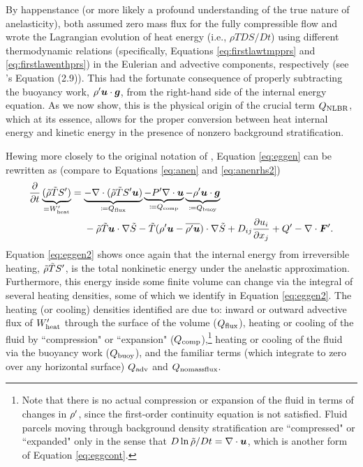 \documentclass[12pt]{article}
\newcommand{\vecf}{\bm{F}}
\newcommand{\heatnlbr}{Q_{\rm NLBR}}
\newcommand{\heatnomassflux}{Q_{\rm nomassflux}}
\newcommand{\heatadv}{Q_{\rm adv}}
\newcommand{\heatcomp}{Q_{\rm comp}}
\newcommand{\heatbuoy}{Q_{\rm buoy}}
\newcommand{\heatfluxin}{Q_{\rm flux}}
\newcommand{\wpheat}{W^\prime_{\rm heat}}
\begin{document}
By happenstance (or more likely a profound understanding of the true nature of anelasticity), \citet{Gough1969} both assumed zero mass flux for the fully compressible flow and wrote the Lagrangian evolution of heat energy (i.e., $\rho T DS/Dt$) using different thermodynamic relations (specifically, Equations \eqref{eq:firstlawtmpprs} and \eqref{eq:firstlawenthprs}) in the Eulerian and advective components, respectively (see \citet{Gough1969}'s Equation (2.9)). This had the fortunate consequence of properly subtracting the buoyancy work, ${\rho^\prime} \bm{u}\cdot \bm{g}$, from the right-hand side of the internal energy equation. As we now show, this is the physical origin of the crucial term $\heatnlbr$, which at its essence, allows for the proper conversion between heat internal energy and kinetic energy in the presence of nonzero background stratification. 

Hewing more closely to the original notation of \citet{Gough1969}, Equation \eqref{eq:eggen} can be rewritten as (compare to Equations \eqref{eq:anen} and \eqref{eq:anenrhs2})
\begin{align}\label{eq:eggen2}
\pderiv{}{t}\underbrace{(\rhotilde\tmptilde\entrprime)}_{=\wpheat} &=\underbrace{-\Div(\rhotilde\tmptilde \entrprime\vecu)}_{\define\heatfluxin} \underbrace{-\prsprime\Div\vecu}_{\define\heatcomp} \underbrace{-\rhoprime \vecu\cdot \vecg}_{\define\heatbuoy} \nonumber\\
&\ \ \ \ - \rhotilde\tmptilde \ugrad \entrtilde- \tmptilde(\rhoprime \vecu-\overline{\rhoprime\vecu})\cdot\nabla\entrtilde +D_{ij}\pderiv{u_i}{x_j} + Q^\prime- \Div\vecf^\prime.
\end{align}
Equation \eqref{eq:eggen2} shows once again that the internal energy from irreversible heating, $\tilde{\rho}\tilde{T} {S^\prime}$, is the total nonkinetic energy under the anelastic approximation. Furthermore, this energy inside some finite volume can change via the integral of several heating densities, some of which we identify in Equation \eqref{eq:eggen2}. The heating (or cooling) densities identified are due to: inward or outward advective flux of $\wpheat$ through the surface of the volume ($\heatfluxin$), heating or cooling of the fluid by ``compression" or ``expansion" ($\heatcomp$),\footnote{Note that there is no actual compression or expansion of the fluid in terms of changes in ${\rho^\prime}$, since the first-order continuity equation is not satisfied. Fluid parcels moving through background density stratification are ``compressed" or ``expanded" only in the sense that $D\ln{\tilde{\rho}}/Dt=\nabla\cdot\bm{u}$, which is another form of Equation \eqref{eq:eggcont}.} heating or cooling of the fluid via the buoyancy work ($\heatbuoy$), and the familiar terms (which integrate to zero over any horizontal surface) $\heatadv$ and $\heatnomassflux$.
\end{document}
